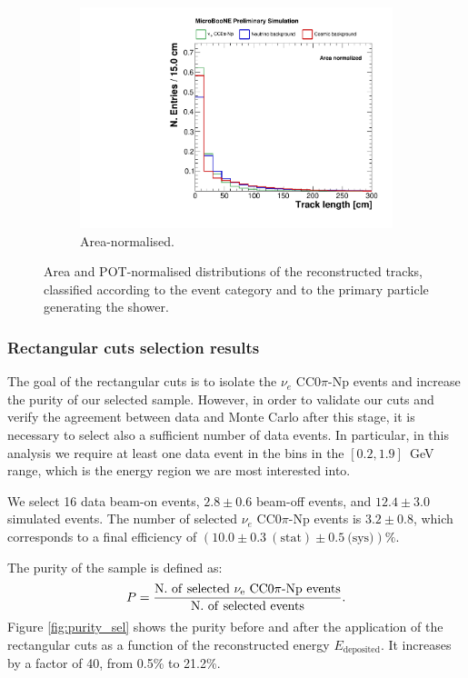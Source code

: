 \begin{figure}[htbp]
\begin{subfigure}{0.49\textwidth}
    \includegraphics[width=\linewidth]{figures/h_track_length_norm.pdf}
    \caption{Area-normalised.} \label{fig:length_norm}
  \end{subfigure}
  \caption{Area and POT-normalised distributions of the reconstructed tracks, classified according to the event category and to the primary particle generating the shower.}
\end{figure}

\subsubsection*{Rectangular cuts selection results}
The goal of the rectangular cuts is to isolate the $\nu_e$ CC0$\pi$-Np events and increase the purity of our selected sample. However, in order to validate our cuts and verify the agreement between data and Monte Carlo after this stage, it is necessary to select also a sufficient number of data events. In particular, in this analysis we require at least one data event in the bins in the $[0.2,1.9]$~GeV range, which is the energy region we are most interested into. 


We select 16 data beam-on events, $2.8\pm0.6$ beam-off events, and $12.4\pm3.0$ simulated events. The number of selected $\nu_e$ CC0$\pi$-Np events is $3.2\pm0.8$, which corresponds to a final efficiency of $(10.0\pm0.3~\mathrm{(stat)}\pm0.5~\text{(sys)})\%$. 

The purity of the sample is defined as:
\begin{equation}
P = \frac{\mathrm{N.~of~selected~\nu_e~CC0}\pi\mathrm{{\text -}Np~events}}{\mathrm{N.~of~selected~events}}.
\end{equation}
Figure \ref{fig:purity_sel} shows the purity before and after the application of the rectangular cuts as a function of the reconstructed energy $E_{\mathrm{deposited}}$. It increases by a factor of 40, from 0.5\% to 21.2\%.

